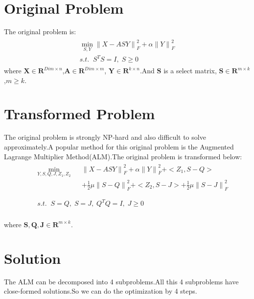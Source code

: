 \documentclass{article}
\begin{document}
\section{Original Problem}
  The original problem is:
\begin{eqnarray}
\begin{array}{l}
    \mathop{\min}\limits_{S, Y} {\parallel X - ASY\parallel}_F^2 + \alpha{\parallel Y\parallel}_F^2\\
    s.t. \;\; S^TS = I, \; S \geq 0
\end{array}
\end{eqnarray}
where $\mathbf{X} \in \mathbf{R}^{Dim\times n}$,$\mathbf{A} \in \mathbf{R}^{Dim\times m}$, $\mathbf{Y} \in \mathbf{R}^{k\times n}$.And $\mathbf{S}$ is a select matrix, $\mathbf{S} \in \mathbf{R}^{m\times k}$,$m \geq k$.

\section{Transformed Problem}
The original problem is strongly NP-hard and also difficult to solve approximately.A popular method for this original problem is the Augmented Lagrange Multiplier Method(ALM).The original problem is transformed below:
\begin{eqnarray}
&& \begin{array}{lll}
\mathop{\min}\limits_{Y,S,Q,J,Z_1,Z_2 } && {\parallel X - ASY\parallel}_F^2  + \alpha{\parallel Y\parallel}_F^2 + <Z_1,S-Q> \\ && + \frac{1}{2}\mu{\parallel S - Q\parallel}_F^2
 + <Z_2,S-J> + \frac{1}{2}\mu{\parallel S - J\parallel}_F^2
\end{array}\\ \nonumber \\
&& \begin{array}{lll}
s.t. \;\; S = Q , \; S = J , \; Q^TQ = I , \; J \geq 0 \nonumber
\end{array}
\end{eqnarray}\\
where $\mathbf{S, Q, J} \in \mathbf{R}^{m\times k}$.
\section{Solution}
The ALM can be decomposed into 4 subproblems.All this 4 subproblems have close-formed solutions.So we can do the optimization by 4 steps.\\
\end{document}
